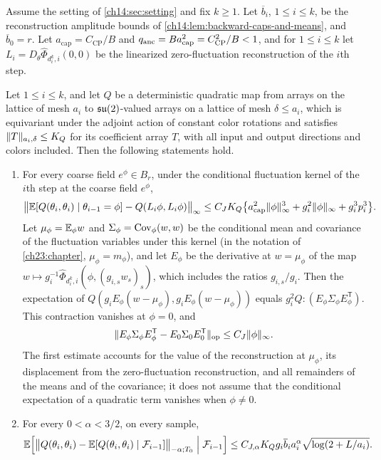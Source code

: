 \begin{theorem}\label{ch14:thm:quadratic-ancestor-return}
Assume the setting of \cref{ch14:sec:setting} and fix $k\ge1$. Let $\overline b_i$, $1\le i\le k$, be the reconstruction amplitude bounds of \cref{ch14:lem:backward-caps-and-means}, and $\overline b_0=r$. Let $a_{\mathrm{cap}}=C_{\mathrm{CP}}/B$ and $q_{\mathrm{anc}}=Ba_{\mathrm{cap}}^2=C_{\mathrm{CP}}^2/B<1$, and for $1\le i\le k$ let $L_i=D_\theta\widehat\Phi_{d_i^k,i}(0,0)$ be the linearized zero-fluctuation reconstruction of the $i$th step.

Let $1\le i\le k$, and let $Q$ be a deterministic quadratic map from arrays on the lattice of mesh $a_i$ to $\mathfrak{su}(2)$-valued arrays on a lattice of mesh $\delta\le a_i$, which is equivariant under the adjoint action of constant color rotations and satisfies $\lVert T\rVert_{a_i,\delta}\le K_Q$ for its coefficient array $T$, with all input and output directions and colors included. Then the following statements hold.
\begin{enumerate}
\item For every coarse field $e^\phi\in B_r$, under the conditional fluctuation kernel of the $i$th step at the coarse field $e^\phi$,
\[
 \bigl\lVert\mathbb E[Q(\theta_i,\theta_i)\mid\theta_{i-1}=\phi]-Q(L_i\phi,L_i\phi)\bigr\rVert_\infty
 \le C_JK_Q\bigl\{a_{\mathrm{cap}}^2\lVert \phi\rVert_\infty^3+g_i^2\lVert \phi\rVert_\infty+g_i^3p_i^3\bigr\}.
\]
Let $\mu_\phi=\mathbb E_\phi w$ and $\Sigma_\phi=\operatorname{Cov}_\phi(w,w)$ be the conditional mean and covariance of the fluctuation variables under this kernel (in the notation of \cref{ch23:chapter}, $\mu_\phi=m_\phi$), and let $E_\phi$ be the derivative at $w=\mu_\phi$ of the map $w\mapsto g_i^{-1}\widehat\Phi_{d_i^k,i}(\phi,(g_{i,s}w_s)_s)$, which includes the ratios $g_{i,s}/g_i$. Then the expectation of $Q(g_iE_\phi(w-\mu_\phi),g_iE_\phi(w-\mu_\phi))$ equals $g_i^2Q:(E_\phi\Sigma_\phi E_\phi^{\mathsf T})$. This contraction vanishes at $\phi=0$, and
\[
 \lVert E_\phi\Sigma_\phi E_\phi^{\mathsf T}-E_0\Sigma_0E_0^{\mathsf T}\rVert_{\mathrm{op}}\le C_J\lVert \phi\rVert_\infty.
\]
The first estimate accounts for the value of the reconstruction at $\mu_\phi$, its displacement from the zero-fluctuation reconstruction, and all remainders of the means and of the covariance; it does not assume that the conditional expectation of a quadratic term vanishes when $\phi\ne0$.
\item For every $0<\alpha<3/2$, on every sample,
\[
 \mathbb E\Bigl[\bigl\lVert Q(\theta_i,\theta_i)-\mathbb E[Q(\theta_i,\theta_i)\mid\mathcal F_{i-1}]\bigr\rVert_{-\alpha;T_0}\Bigm|\mathcal F_{i-1}\Bigr]
 \le C_{J,\alpha}K_Qg_i\overline b_ia_i^\alpha\sqrt{\log(2+L/a_i)}.
\]
\end{enumerate}
\end{theorem}
